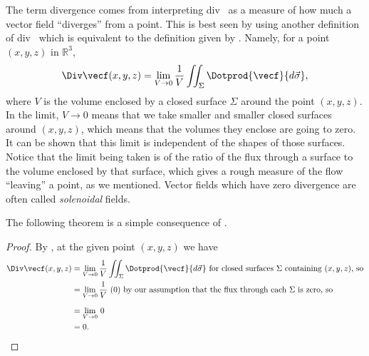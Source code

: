 The term divergence comes from interpreting div \vecf\ as a measure of how much a vector field ``diverges'' from a point. This is best seen by using another definition of div \vecf\ which is equivalent
to the definition given by . Namely, for a point $(x,y,z)$ in $\mathbb{R}^{3}$,
\begin{equation}\label{eqn:divalt}
 \Div\vecf(x,y,z) = \lim_{V \to 0} \frac{1}{V} \iint_{\Sigma} \Dotprod{\vecf}{d\vec\sigma} ,
\end{equation}
where $V$ is the volume enclosed by a closed surface $\Sigma$ around the point $(x,y,z)$. In the limit, $V \to 0$ means that we take smaller and smaller closed surfaces around $(x,y,z)$, which means that the volumes they enclose are going to zero. It can be shown that this limit is independent of the shapes of those surfaces. Notice that the limit being taken is of the ratio of the flux through a surface to the volume enclosed by that surface, which gives a rough measure of the flow ``leaving'' a point, as we mentioned. Vector fields which have zero divergence are often called \emph{solenoidal} fields.

The following theorem is a simple consequence of .


\begin{proof}
 By , at the given point $(x,y,z)$ we have 
 \begin{align*}
  \Div\vecf(x,y,z) &= \lim_{V \to 0} \frac{1}{V} \iint_{\Sigma} \Dotprod{\vecf}{d\vec\sigma}
   \text{ for closed surfaces $\Sigma$ containing $(x,y,z)$, so}\\
    &= \lim_{V \to 0} \frac{1}{V} \,\, (0) \text{ by our assumption that the flux through each $\Sigma$ is
    zero, so}\\[6pt]
    &= \lim_{V \to 0} \, 0\\
    &= 0 .\qedhere
 \end{align*}
\end{proof}


